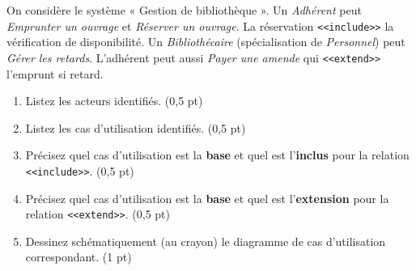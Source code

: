 \documentclass[11pt]{article}
\begin{document}
\begin{exercice}
On considère le système « Gestion de bibliothèque ». Un \textit{Adhérent} peut \textit{Emprunter un ouvrage} et \textit{Réserver un ouvrage}. La réservation \texttt{<<include>>} la vérification de disponibilité. Un \textit{Bibliothécaire} (spécialisation de \textit{Personnel}) peut \textit{Gérer les retards}. L'adhérent peut aussi \textit{Payer une amende} qui \texttt{<<extend>>} l'emprunt si retard.
\begin{enumerate}
    \item Listez les acteurs identifiés. \hfill (0,5 pt)
    \item Listez les cas d'utilisation identifiés. \hfill (0,5 pt)
    \item Précisez quel cas d'utilisation est la \textbf{base} et quel est l'\textbf{inclus} pour la relation \texttt{<<include>>}. \hfill (0,5 pt)
    \item Précisez quel cas d'utilisation est la \textbf{base} et quel est l'\textbf{extension} pour la relation \texttt{<<extend>>}. \hfill (0,5 pt)
    \item Dessinez schématiquement (au crayon) le diagramme de cas d'utilisation correspondant. \hfill (1 pt)
\end{enumerate}
\end{exercice}
\end{document}
